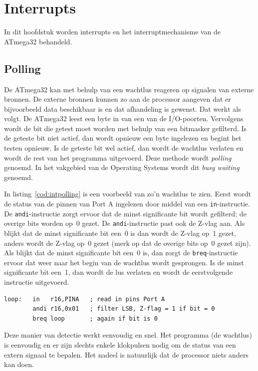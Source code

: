 \chapter{Interrupts}
In dit hoofdstuk worden interrupts en het interruptmechanisme van de ATmega32
behandeld.

\section{Polling}
De ATmega32 kan met behulp van een wachtlus reageren op signalen van
externe bronnen. De externe bronnen kunnen zo aan de processor aangeven
dat er bijvoorbeeld data beschikbaar is en dat afhandeling is gewenst.
Dat werkt als volgt. De ATmega32 leest een byte in van een van de
I/O-poorten. Vervolgens wordt de bit die getest moet worden met behulp
van een bitmasker gefilterd. Is de geteste bit niet actief, dan wordt
opnieuw een byte ingelezen en begint het testen opnieuw. Is de geteste
bit wel actief, dan wordt de wachtlus verlaten en wordt de rest van het
programma uitgevoerd. 
Deze methode wordt \textsl{polling} genoemd. In het vakgebied van de
Operating Systems wordt dit \textsl{busy waiting} genoemd.

In listing~\ref{cod:intpolling} is een voorbeeld van zo'n wachtlus te zien.
Eerst wordt de status van de pinnen van Port A ingelezen door middel van
een \lstinline|in|-instructie. De \lstinline|andi|-instructie zorgt ervoor
dat de minst significante bit wordt gefilterd; de overige bits worden op~0
gezet. De \lstinline|andi|-instructie past ook de Z-vlag aan. Als blijkt
dat de minst significante bit een~0 is dan wordt de Z-vlag op~1 gezet,
anders wordt de Z-vlag op~0 gezet (merk op dat de overige bits op~0 gezet
zijn). Als blijkt dat de minst significante bit een~0 is, dan zorgt de
\lstinline|breq|-instructie ervoor dat weer naar het begin van de wachtlus
wordt gesprongen. Is de minst significante bit een~1, dan wordt de lus
verlaten en wordt de eerstvolgende instructie uitgevoerd. 

\begin{lstlisting}[language=AVRassembler,caption=Polling.,label=cod:intpolling]
loop:	in   r16,PINA   ; read in pins Port A
		andi r16,0x01   ; filter LSB, Z-flag = 1 if bit = 0
		breq loop       ; again if bit is 0
\end{lstlisting}

Deze manier van detectie werkt eenvoudig en snel. Het programma (de wachtlus)
is eenvoudig en er zijn slechts enkele klokpulsen nodig om de status van een
extern signaal te bepalen. Het nadeel is natuurlijk dat de processor niets
anders kan doen.


